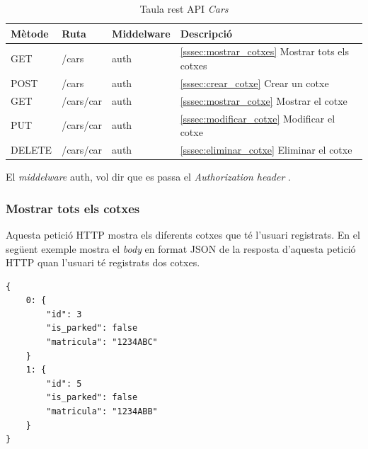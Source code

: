 
\begin{table}[H]
\centering
\begin{tabular}{llll}
\hline
\textbf{Mètode} & \textbf{Ruta} & \textbf{Middelware} & \textbf{Descripció} \\ \hline
GET             & /cars       & auth &  \autoref{sssec:mostrar_cotxes}{ Mostrar tots els cotxes}     \\ \hline
POST            & /cars        & auth &  \autoref{sssec:crear_cotxe}{ Crear un cotxe}     \\ \hline
GET             & /cars/{car}  & auth &  \autoref{sssec:mostrar_cotxe}{ Mostrar el cotxe}     \\ \hline
PUT             & /cars/{car}  & auth &  \autoref{sssec:modificar_cotxe}{ Modificar el cotxe}     \\ \hline
DELETE          & /cars/{car}  & auth &  \autoref{sssec:eliminar_cotxe}{ Eliminar el cotxe}     \\ \hline
\end{tabular}
\caption{Taula rest API \emph{Cars}}
\label{tab:my-cars-api-table}
\end{table}

El \emph{middelware} auth, vol dir que es passa el \emph{Authorization header} \autocite{middleware_laravel}.

\subsubsection{Mostrar tots els cotxes}
\label{sssec:mostrar_cotxes}

Aquesta petició HTTP mostra els diferents cotxes que té l'usuari registrats.
En el següent exemple mostra el \emph{body} en format JSON de la resposta d'aquesta
petició HTTP quan l'usuari té registrats dos cotxes.
\begin{verbatim}
{
    0: {
        "id": 3
        "is_parked": false
        "matricula": "1234ABC"
    }
    1: {
        "id": 5
        "is_parked": false
        "matricula": "1234ABB"
    }
}
\end{verbatim}

